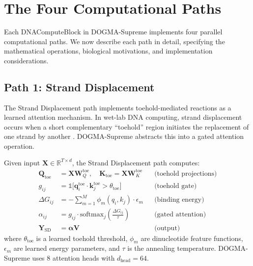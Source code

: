 \section{The Four Computational Paths}
\label{sec:four-paths}

Each DNAComputeBlock in DOGMA-Supreme implements four parallel computational paths. We now describe each path in detail, specifying the mathematical operations, biological motivations, and implementation considerations.

\subsection{Path 1: Strand Displacement}
\label{sec:strand-displacement-path}

The Strand Displacement path implements toehold-mediated reactions as a learned attention mechanism. In wet-lab DNA computing, strand displacement occurs when a short complementary ``toehold'' region initiates the replacement of one strand by another \citep{zhang2011}. DOGMA-Supreme abstracts this into a gated attention operation.

\begin{dogmadef}
Given input $\mathbf{X} \in \mathbb{R}^{T \times d}$, the Strand Displacement path computes:
\begin{align}
\mathbf{Q}_{\mathrm{toe}} &= \mathbf{X} \mathbf{W}_Q^{\mathrm{toe}}, \quad \mathbf{K}_{\mathrm{toe}} = \mathbf{X} \mathbf{W}_K^{\mathrm{toe}} & & \text{(toehold projections)} \label{eq:toehold-proj} \\
g_{ij} &= \mathbb{1}\bigl[\mathbf{q}_i^{\mathrm{toe}} \cdot \mathbf{k}_j^{\mathrm{toe}} > \theta_{\mathrm{toe}}\bigr] & & \text{(toehold gate)} \label{eq:toehold-gate} \\
\Delta G_{ij} &= -\sum_{m=1}^{M} \phi_m(q_i, k_j) \cdot \epsilon_m & & \text{(binding energy)} \label{eq:binding-energy} \\
\alpha_{ij} &= g_{ij} \cdot \mathrm{softmax}_j\!\left(\frac{\Delta G_{ij}}{\tau}\right) & & \text{(gated attention)} \label{eq:gated-attn} \\
\mathbf{Y}_{\mathrm{SD}} &= \boldsymbol{\alpha} \mathbf{V} & & \text{(output)}
\end{align}
where $\theta_{\mathrm{toe}}$ is a learned toehold threshold, $\phi_m$ are dinucleotide feature functions, $\epsilon_m$ are learned energy parameters, and $\tau$ is the annealing temperature. DOGMA-Supreme uses 8 attention heads with $d_{\mathrm{head}} = 64$.
\end{dogmadef}

